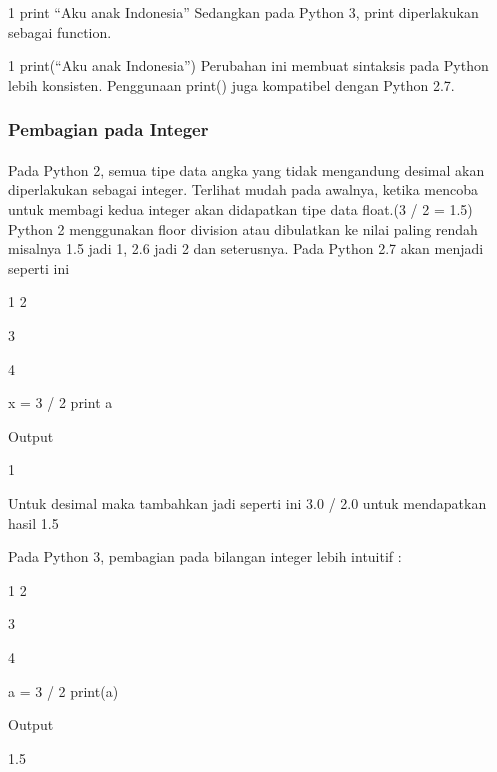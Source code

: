\documentclass{article}
\begin{document}
1	print “Aku anak Indonesia”
Sedangkan pada Python 3, print diperlakukan sebagai function.

1	print(“Aku anak Indonesia”)
Perubahan ini membuat sintaksis pada Python lebih konsisten. Penggunaan print()  juga kompatibel dengan Python 2.7.
\paragraph{}
\subsubsection{Pembagian pada Integer}
\paragraph{}
Pada Python 2, semua tipe data angka yang tidak mengandung desimal akan diperlakukan sebagai integer. Terlihat mudah pada awalnya, ketika mencoba untuk membagi kedua integer akan didapatkan tipe data float.(3 / 2 = 1.5)
Python 2 menggunakan floor division atau dibulatkan ke nilai paling rendah misalnya 1.5 jadi 1, 2.6 jadi 2 dan seterusnya. Pada Python 2.7 akan menjadi seperti ini

1
2

3

4

x = 3 / 2
print a

Output

1

Untuk desimal maka tambahkan jadi seperti ini 3.0 / 2.0  untuk mendapatkan hasil 1.5

Pada Python 3, pembagian pada bilangan integer lebih intuitif :

1
2

3

4

a = 3 / 2
print(a)

Output

1.5
\paragraph{}
\end{document}
